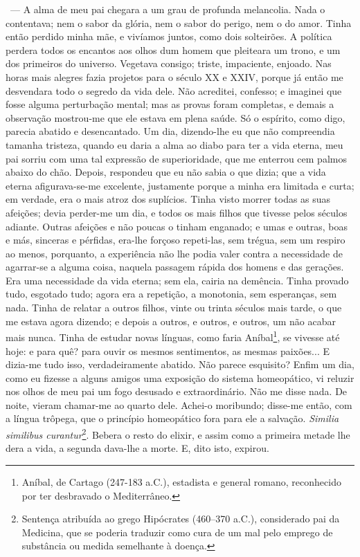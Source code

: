 ~--- A alma de meu pai chegara a um grau de profunda melancolia. Nada o
contentava; nem o sabor da glória, nem o sabor do perigo, nem o do amor.
Tinha então perdido minha mãe, e vivíamos juntos, como dois solteirões.
A política perdera todos os encantos aos olhos dum homem que pleiteara
um trono, e um dos primeiros do universo. Vegetava consigo; triste,
impaciente, enjoado. Nas horas mais alegres fazia projetos para o século
XX e XXIV, porque já então me desvendara todo o segredo da vida dele.
Não acreditei, confesso; e imaginei que fosse alguma perturbação mental;
mas as provas foram completas, e demais a observação mostrou-me que ele
estava em plena saúde. Só o espírito, como digo, parecia abatido e
desencantado. Um dia, dizendo-lhe eu que não compreendia tamanha
tristeza, quando eu daria a alma ao diabo para ter a vida eterna, meu
pai sorriu com uma tal expressão de superioridade, que me enterrou cem
palmos abaixo do chão. Depois, respondeu que eu não sabia o que dizia;
que a vida eterna afigurava-se-me excelente, justamente porque a minha
era limitada e curta; em verdade, era o mais atroz dos suplícios. Tinha
visto morrer todas as suas afeições; devia perder-me um dia, e todos os
mais filhos que tivesse pelos séculos adiante. Outras afeições e não
poucas o tinham enganado; e umas e outras, boas e más, sinceras e
pérfidas, era-lhe forçoso repeti-las, sem trégua, sem um respiro ao
menos, porquanto, a experiência não lhe podia valer contra a necessidade
de agarrar-se a alguma coisa, naquela passagem rápida dos homens e das
gerações. Era uma necessidade da vida eterna; sem ela, cairia na
demência. Tinha provado tudo, esgotado tudo; agora era a repetição, a
monotonia, sem esperanças, sem nada. Tinha de relatar a outros filhos,
vinte ou trinta séculos mais tarde, o que me estava agora dizendo; e
depois a outros, e outros, e outros, um não acabar mais nunca. Tinha de
estudar novas línguas, como faria Aníbal\footnote{Aníbal, de Cartago
  (247-183 a.C.), estadista e general romano, reconhecido por ter
  desbravado o Mediterrâneo.}, se vivesse até hoje: e para quê? para
ouvir os mesmos sentimentos, as mesmas paixões... E dizia-me tudo isso,
verdadeiramente abatido. Não parece esquisito? Enfim um dia, como eu
fizesse a alguns amigos uma exposição do sistema homeopático, vi reluzir
nos olhos de meu pai um fogo desusado e extraordinário. Não me disse
nada. De noite, vieram chamar-me ao quarto dele. Achei-o moribundo;
disse-me então, com a língua trôpega, que o princípio homeopático fora
para ele a salvação. \emph{Similia similibus curantur}\footnote{Sentença
  atribuída ao grego Hipócrates (460--370 a.C.), considerado pai da
  Medicina, que se poderia traduzir como cura de um mal pelo emprego de
  substância ou medida semelhante à doença.}. Bebera o resto do elixir,
e assim como a primeira metade lhe dera a vida, a segunda dava-lhe a
morte. E, dito isto, expirou.

